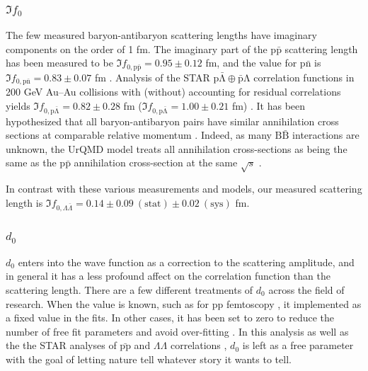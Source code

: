 




\subsubsection{$\Im f_0$}
\label{Imf0Result}


The few measured baryon-antibaryon scattering lengths have imaginary components on the order of 1 fm.
The imaginary part of the $\mathrm{p\bar{p}}$ scattering length has been measured to be $\Im f_{0,\mathrm{p\bar{p}}} = 0.95 \pm 0.12$ fm, and the value for $\mathrm{p\bar{n}}$ is $\Im f_{0,\mathrm{p\bar{n}}} = 0.83 \pm 0.07$ fm \cite{Mutchler:1988av}. 
Analysis of the STAR $\mathrm{p\bar{\Lambda} \oplus \bar{p}\Lambda}$ correlation functions in 200 GeV Au--Au \cite{Adams:2005ws} collisions with (without) accounting for residual correlations yields $\Im f_{0,\mathrm{p\bar{\Lambda}}} = 0.82 \pm 0.28$ fm ($\Im f_{0,\mathrm{p\bar{\Lambda}}} = 1.00 \pm 0.21$ fm) \cite{Kisiel:2014mma}.
It has been hypothesized that all baryon-antibaryon pairs have similar annihilation cross sections at comparable relative momentum \cite{Kisiel:2014mma}.
Indeed, as many $\mathrm{B\bar{B}}$ interactions are unknown, the UrQMD model treats all annihilation cross-sections as being the same as the $\mathrm{p\bar{p}}$ annihilation cross-section at the same $\sqrt{s}$ \cite{Bleicher:1999xi}.

In contrast with these various measurements and models, our measured scattering length is $\Im f_{0,\Lambda\bar{\Lambda}} = 0.14 \pm 0.09\ (\mathrm{stat}) \pm 0.02\ (\mathrm{sys})$ fm.

\subsubsection{$d_0$}

$d_0$ enters into the wave function as a correction to the scattering amplitude, and in general it has a less profound affect on the correlation function than the scattering length.
There are a few different treatments of $d_0$ across the field of research.
When the value is known, such as for pp femtoscopy \cite{Adam:2015vja}, it implemented as a fixed value in the fits.
In other cases, it has been set to zero to reduce the number of free fit parameters and avoid over-fitting \cite{Kisiel:2014mma, Shapoval:2014yha, Adams:2005ws}.
In this analysis as well as the the STAR analyses of $\bar{\mathrm{pp}}$ and $\Lambda\Lambda$ correlations \cite{Adamczyk:2015hza, Adamczyk:2014vca}, $d_0$ is left as a free parameter with the goal of letting nature tell whatever story it wants to tell.

